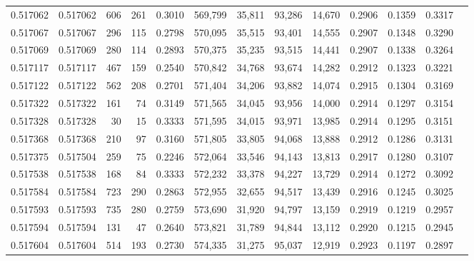 \begin{tabular}{rrrrrrrrrrrrr}
0.517062 & 0.517062 &   606 &   261 &                                     0.3010 & 569,799 &  35,811 &  93,286 &  14,670 & 0.2906 & 0.1359 & 0.3317 \\
0.517067 & 0.517067 &   296 &   115 &                                     0.2798 & 570,095 &  35,515 &  93,401 &  14,555 & 0.2907 & 0.1348 & 0.3290 \\
0.517069 & 0.517069 &   280 &   114 &                                     0.2893 & 570,375 &  35,235 &  93,515 &  14,441 & 0.2907 & 0.1338 & 0.3264 \\
0.517117 & 0.517117 &   467 &   159 &                                     0.2540 & 570,842 &  34,768 &  93,674 &  14,282 & 0.2912 & 0.1323 & 0.3221 \\
0.517122 & 0.517122 &   562 &   208 &                                     0.2701 & 571,404 &  34,206 &  93,882 &  14,074 & 0.2915 & 0.1304 & 0.3169 \\
0.517322 & 0.517322 &   161 &    74 &                                     0.3149 & 571,565 &  34,045 &  93,956 &  14,000 & 0.2914 & 0.1297 & 0.3154 \\
0.517328 & 0.517328 &    30 &    15 &                                     0.3333 & 571,595 &  34,015 &  93,971 &  13,985 & 0.2914 & 0.1295 & 0.3151 \\
0.517368 & 0.517368 &   210 &    97 &                                     0.3160 & 571,805 &  33,805 &  94,068 &  13,888 & 0.2912 & 0.1286 & 0.3131 \\
0.517375 & 0.517504 &   259 &    75 &                                     0.2246 & 572,064 &  33,546 &  94,143 &  13,813 & 0.2917 & 0.1280 & 0.3107 \\
0.517538 & 0.517538 &   168 &    84 &                                     0.3333 & 572,232 &  33,378 &  94,227 &  13,729 & 0.2914 & 0.1272 & 0.3092 \\
0.517584 & 0.517584 &   723 &   290 &                                     0.2863 & 572,955 &  32,655 &  94,517 &  13,439 & 0.2916 & 0.1245 & 0.3025 \\
0.517593 & 0.517593 &   735 &   280 &                                     0.2759 & 573,690 &  31,920 &  94,797 &  13,159 & 0.2919 & 0.1219 & 0.2957 \\
0.517594 & 0.517594 &   131 &    47 &                                     0.2640 & 573,821 &  31,789 &  94,844 &  13,112 & 0.2920 & 0.1215 & 0.2945 \\
0.517604 & 0.517604 &   514 &   193 &                                     0.2730 & 574,335 &  31,275 &  95,037 &  12,919 & 0.2923 & 0.1197 & 0.2897 \\

\end{tabular}
